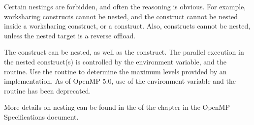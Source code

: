 Certain nestings are forbidden, and often the reasoning is obvious.  For example, worksharing constructs cannot be nested, and
the  construct cannot be nested inside a worksharing construct, or a  construct. 
Also,  constructs cannot be nested, unless the nested target is a reverse offload.

The  construct can be nested, as well as the  construct.  
The parallel execution in the nested  construct(s) is controlled by the 
 environment variable, and the  routine. 
Use the  routine to determine the maximum levels provided by an implementation.
As of OpenMP 5.0, use of the  environment variable and the  routine 
has been deprecated.

More details on nesting can be found in the  of the  
chapter in the OpenMP Specifications document.

















